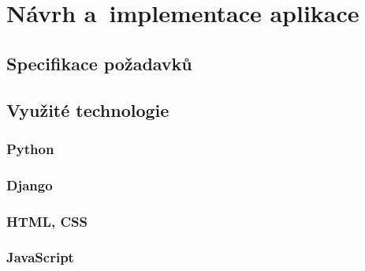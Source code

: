 



\chapter{Návrh a~implementace aplikace}

\dummyText


\section{Specifikace požadavků}

\dummyText

\dummyText


\section{Využité technologie}

\dummyShortText[9]


\subsection*{Python}

\dummyText[2]


\subsection*{Django}

\dummyShortText[13]

\dummyText


\subsection*{HTML, CSS}

\dummyText


\subsection*{JavaScript}

